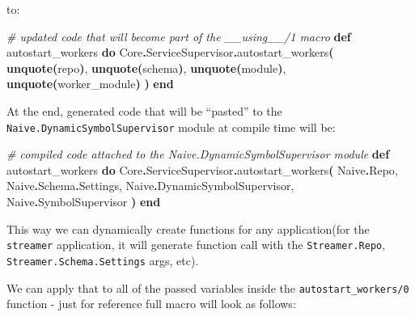 \documentclass[
  oneside]{book}
\newenvironment{Shaded}{\begin{snugshade}}{\end{snugshade}}
\newcommand{\CommentTok}[1]{\textcolor[rgb]{0.56,0.35,0.01}{\textit{#1}}}
\newcommand{\ConstantTok}[1]{\textcolor[rgb]{0.56,0.35,0.01}{#1}}
\newcommand{\FunctionTok}[1]{\textcolor[rgb]{0.13,0.29,0.53}{\textbf{#1}}}
\newcommand{\KeywordTok}[1]{\textcolor[rgb]{0.13,0.29,0.53}{\textbf{#1}}}
\newcommand{\NormalTok}[1]{#1}
\newcommand{\OperatorTok}[1]{\textcolor[rgb]{0.81,0.36,0.00}{\textbf{#1}}}
\begin{document}
to:

\begin{Shaded}
\begin{Highlighting}[]
      \CommentTok{\# updated code that will become part of the \textasciigrave{}\_\_using\_\_/1\textasciigrave{} macro}
      \KeywordTok{def}\NormalTok{ autostart\_workers }\KeywordTok{do}
        \ConstantTok{Core}\OperatorTok{.}\ConstantTok{ServiceSupervisor}\OperatorTok{.}\NormalTok{autostart\_workers}\FunctionTok{(}
          \KeywordTok{unquote}\FunctionTok{(}\NormalTok{repo}\FunctionTok{)}\NormalTok{,}
          \KeywordTok{unquote}\FunctionTok{(}\NormalTok{schema}\FunctionTok{)}\NormalTok{,}
          \KeywordTok{unquote}\FunctionTok{(}\NormalTok{module}\FunctionTok{)}\NormalTok{,}
          \KeywordTok{unquote}\FunctionTok{(}\NormalTok{worker\_module}\FunctionTok{)}
        \FunctionTok{)}
      \KeywordTok{end}
\end{Highlighting}
\end{Shaded}

At the end, generated code that will be ``pasted'' to the \texttt{Naive.DynamicSymbolSupervisor} module at compile time will be:

\begin{Shaded}
\begin{Highlighting}[]
    \CommentTok{\# compiled code attached to the \textasciigrave{}Naive.DynamicSymbolSupervisor\textasciigrave{} module}
    \KeywordTok{def}\NormalTok{ autostart\_workers }\KeywordTok{do}
      \ConstantTok{Core}\OperatorTok{.}\ConstantTok{ServiceSupervisor}\OperatorTok{.}\NormalTok{autostart\_workers}\FunctionTok{(}
        \ConstantTok{Naive}\OperatorTok{.}\ConstantTok{Repo}\NormalTok{,}
        \ConstantTok{Naive}\OperatorTok{.}\ConstantTok{Schema}\OperatorTok{.}\ConstantTok{Settings}\NormalTok{,}
        \ConstantTok{Naive}\OperatorTok{.}\ConstantTok{DynamicSymbolSupervisor}\NormalTok{,}
        \ConstantTok{Naive}\OperatorTok{.}\ConstantTok{SymbolSupervisor}
      \FunctionTok{)}
    \KeywordTok{end}
\end{Highlighting}
\end{Shaded}

This way we can dynamically create functions for any application(for the \texttt{streamer} application, it will generate function call with the \texttt{Streamer.Repo}, \texttt{Streamer.Schema.Settings} args, etc).

We can apply that to all of the passed variables inside the \texttt{autostart\_workers/0} function - just for reference full macro will look as follows:
\end{document}
